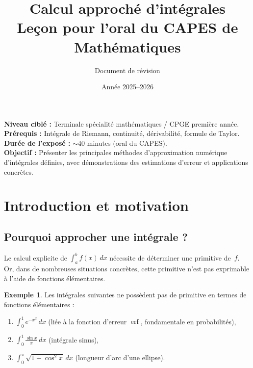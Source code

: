 \documentclass[a4paper,12pt]{article}
\title{%
  \textbf{Calcul approché d'intégrales}\\[0.5em]
  \large Leçon pour l'oral du CAPES de Mathématiques
}
\author{Document de révision}
\date{Année 2025--2026}
\theoremstyle{definition}
\newtheorem{exemple}{Exemple}[section]
\theoremstyle{plain}
\theoremstyle{remark}
\begin{document}
\maketitle

\begin{tcolorbox}[colback=blue!5!white, colframe=blue!50!black, title=Contexte de la leçon]
\textbf{Niveau ciblé :} Terminale spécialité mathématiques / CPGE première année.\\
\textbf{Prérequis :} Intégrale de Riemann, continuité, dérivabilité, formule de Taylor.\\
\textbf{Durée de l'exposé :} $\sim$40 minutes (oral du CAPES).\\
\textbf{Objectif :} Présenter les principales méthodes d'approximation numérique d'intégrales définies, avec démonstrations des estimations d'erreur et applications concrètes.
\end{tcolorbox}

\tableofcontents
\newpage

\section{Introduction et motivation}

\subsection{Pourquoi approcher une intégrale ?}

Le calcul explicite de $\displaystyle\int_a^b f(x)\,dx$ nécessite de déterminer une primitive de~$f$. Or, dans de nombreuses situations concrètes, cette primitive n'est pas exprimable à l'aide de fonctions élémentaires.

\begin{exemple}
Les intégrales suivantes ne possèdent pas de primitive en termes de fonctions élémentaires :
\begin{enumerate}[label=(\roman*)]
  \item $\displaystyle\int_0^1 e^{-x^2}\,dx$ \quad (liée à la fonction d'erreur $\operatorname{erf}$, fondamentale en probabilités),
  \item $\displaystyle\int_0^1 \frac{\sin x}{x}\,dx$ \quad (intégrale sinus),
  \item $\displaystyle\int_0^{\pi} \sqrt{1+\cos^2 x}\,dx$ \quad (longueur d'arc d'une ellipse).
\end{enumerate}
\end{exemple}
\end{document}
